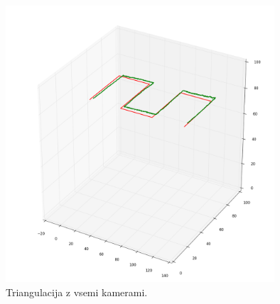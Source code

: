 \documentclass[a4paper, 12pt]{book}
\begin{document}
\begin{figure}
\centering
\includegraphics[width=10cm]{1234.png}
\caption{Triangulacija z vsemi kamerami.}
\end{figure}
\end{document}
